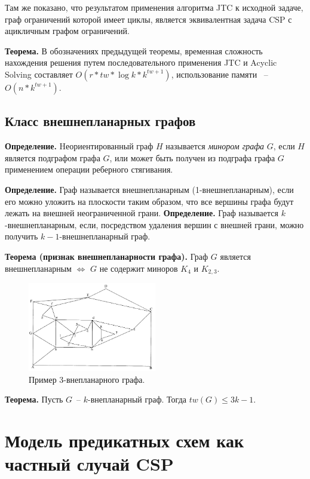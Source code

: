 \documentclass[12pt]{article}
\begin{document}
Там же показано, что результатом применения алгоритма JTC к исходной задаче, граф ограничений которой имеет циклы,
является эквивалентная задача CSP с ацикличным графом ограничений.

\textbf{Теорема.} В обозначениях предыдущей теоремы, временная
сложность нахождения решения путем последовательного применения JTC и Acyclic Solving составляет $O(r*tw*\log{k}*k^{tw+1})$,
использование памяти ~-- $O(n*k^{tw+1})$.\cite{CSP10}

\subsection{Класс внешнепланарных графов}

\textbf{Определение.}
Hеориентированный граф $H$ называется \textit{минором графа} $G$, если $H$
является подграфом графа $G$, или может быть получен из подграфа графа $G$ применением операции реберного стягивания.

\textbf{Определение.}
Граф называется внешнепланарным (1-внешнепланарным), если его можно уложить на плоскости таким образом, 
что все вершины графа будут лежать на внешней неограниченной грани.
\textbf{Определение.}
Граф называется $k$-внешнепланарным, если, посредством удаления вершин с внешней грани, 
можно получить $k-1$-внешнепланарный граф.

\textbf{Теорема (признак внешнепланарности графа).}
Граф $G$ является внешнепланарным $\iff$ $G$ не содержит миноров $K_4$ и $K_{2,3}$\cite{Diestel00}.

\begin{figure}[htb]
\centering
\includegraphics[width=0.50\textwidth]{outerplanar.png}
\caption{Пример 3-внепланарного графа.}
\label{fig:outerplanar_graph}
\end{figure}

\textbf{Теорема.}
Пусть $G$~-- $k$-внепланарный граф. Тогда $tw(G) \leq 3k-1.$\cite{Boedlander96}

\section{Модель предикатных схем как частный случай CSP}
\end{document}

